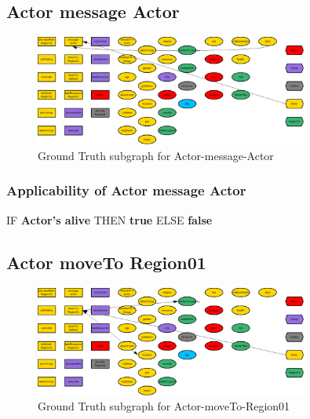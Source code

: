 \documentclass{article}%
\begin{document}
%
\subsection{Actor message Actor}%
\label{subsec:Actor message Actor}%


\begin{figure}[ht]%
\centering%
\includegraphics[width=0.8\textwidth]{images/Actor-message-Actor.png}%
\caption{Ground Truth subgraph for Actor{-}message{-}Actor}%
\end{figure}

%
\subsubsection{Applicability of Actor message Actor}%
\label{ssubsec:Applicability of Actor message Actor}%
\begin{flushleft}%
IF %
\textbf{Actor's alive}%
\linebreak%
\hspace*{2em}%
THEN %
\textbf{true}%
\linebreak%
\hspace*{2em}%
ELSE %
\textbf{false}%
\end{flushleft}

%
\subsection{Actor moveTo Region01}%
\label{subsec:Actor moveTo Region01}%


\begin{figure}[ht]%
\centering%
\includegraphics[width=0.8\textwidth]{images/Actor-moveTo-Region01.png}%
\caption{Ground Truth subgraph for Actor{-}moveTo{-}Region01}%
\end{figure}
\end{document}
